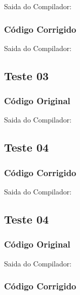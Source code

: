 Saida do Compilador:




\subsubsection{Código Corrigido}


Saida do Compilador:




\subsection{Teste 03}
\label{subsec:sintaticoTeste03}

\subsubsection{Código Original}


Saida do Compilador:



\subsection{Teste 04}

\subsubsection{Código Corrigido}


Saida do Compilador:




\subsection{Teste 04}
\label{subsec:sintaticoTeste04}

\subsubsection{Código Original}


Saida do Compilador:




\subsubsection{Código Corrigido}


